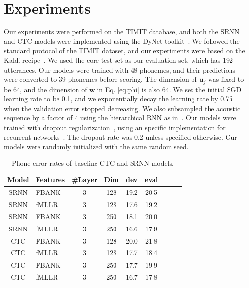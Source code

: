 \documentclass[a4paper]{article}
\begin{document}
\section{Experiments}

Our experiments were performed on the TIMIT database, and both the SRNN and CTC models were implemented using the DyNet toolkit~\cite{neubig2017dynet}. We followed the standard protocol of the TIMIT dataset, and our experiments were based on the Kaldi recipe~\cite{povey2011kaldi}. We used the core test set as our evaluation set, which has 192 utterances. Our models were trained with 48 phonemes, and their predictions were converted to 39 phonemes before scoring. The dimension of $\mathbf{u}_j$ was fixed to be 64, and the dimension of $\mathbf{w}$ in Eq. \eqref{eq:phi} is also 64. We set the initial SGD learning rate to be 0.1, and we exponentially decay the learning rate by 0.75 when the validation error stopped decreasing. We also subsampled the acoustic sequence by a factor of 4 using the hierarchical RNN as in~\cite{lu2016segmental}. Our models were trained with dropout regularization~\cite{srivastava2014dropout}, using an specific implementation for recurrent networks~\cite{zaremba2014recurrent}. The dropout rate was 0.2 unless specified otherwise. Our models were randomly initialized with the same random seed.

\begin{table}
 \centering \small
\caption{Phone error rates of baseline CTC and SRNN models. }
\label{tab:baseline}
\begin{tabular}{cl|ccccccc}
\hline

\hline
Model & Features  & \#Layer & Dim & dev  & eval \\ \hline
SRNN & FBANK & 3 & 128 & 19.2 & 20.5 \\
SRNN & fMLLR & 3 & 128 & 17.6 & 19.2 \\
SRNN & FBANK & 3& 250 & 18.1 & 20.0\\
SRNN & fMLLR & 3 & 250 & 16.6 & 17.9 \\ \hline
CTC & FBANK & 3&  128 & 20.0 & 21.8 \\ 
CTC & fMLLR & 3 & 128 & 17.7 & 18.4 \\
CTC & FBANK & 3&  250 & 17.7 & 19.9 \\ 
CTC & fMLLR & 3 & 250 & 16.7 & 17.8 \\ \hline

\hline
\end{tabular}
\end{table}
\end{document}
